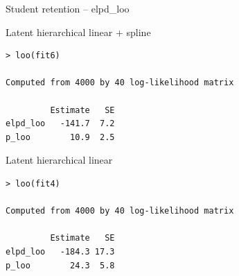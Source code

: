 \documentclass[english,t]{beamer}
\begin{document}
\begin{frame}[fragile]{Student retention -- elpd\_loo}

Latent hierarchical linear + spline
\begin{verbatim}
> loo(fit6)

Computed from 4000 by 40 log-likelihood matrix

         Estimate   SE
elpd_loo   -141.7  7.2
p_loo        10.9  2.5
\end{verbatim}

\pause
Latent hierarchical linear
\begin{verbatim}
> loo(fit4)

Computed from 4000 by 40 log-likelihood matrix

         Estimate   SE
elpd_loo   -184.3 17.3
p_loo        24.3  5.8
\end{verbatim}

\end{frame}
\end{document}
